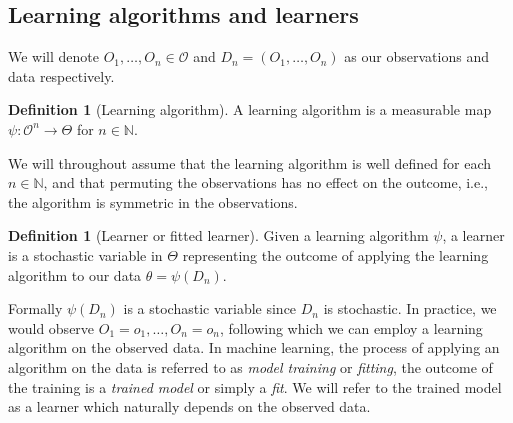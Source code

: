 \documentclass[11pt, a4paper]{article}
\theoremstyle{definition}
\newtheorem{definition}[theorem]{Definition}
\theoremstyle{remark}
\newcommand{\btheta}{\theta}
\newcommand{\la}{\psi}
\begin{document}
\subsection{Learning algorithms and learners}
We will denote $ O_1 , \dots , O_n \in \mathcal{O} $ and $ D_n = (O_1 , \dots , O_n) $ as our observations and data respectively. 
\begin{definition}[Learning algorithm]
    A learning algorithm is a measurable map $ \la : \mathcal{O}^{n} \to \Theta $ for $ n \in \mathbb{N} $. 
\end{definition}
We will throughout assume that the learning algorithm is well defined for each $ n \in \mathbb{N} $, and that permuting the observations has no effect on the outcome, i.e., the algorithm is symmetric in the observations.  
\begin{definition}[Learner or fitted learner]
    Given a learning algorithm $ \la $, a learner is a stochastic variable in $ \Theta $ representing the outcome of applying the learning algorithm to our data $ \btheta = \la(D_n) $.
\end{definition}
Formally $ \la(D_n) $ is a stochastic variable since $ D_n $ is stochastic. In practice, we would observe $ O_1 = o_1, \dots, O_n = o_n $, following which we can employ a learning algorithm on the observed data. In machine learning, the process of applying an algorithm on the data is referred to as \textit{model training} or \textit{fitting}, the outcome of the training is a \textit{trained model} or simply a \textit{fit}. We will refer to the trained model as a learner which naturally depends on the observed data. 
\end{document}
